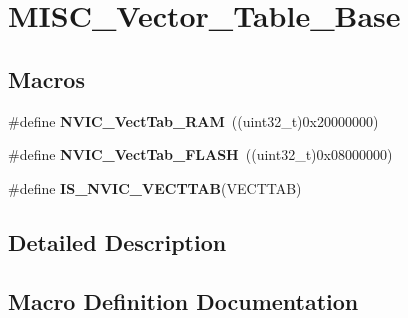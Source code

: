 \hypertarget{group___m_i_s_c___vector___table___base}{}\section{M\+I\+S\+C\+\_\+\+Vector\+\_\+\+Table\+\_\+\+Base}
\label{group___m_i_s_c___vector___table___base}
\subsection*{Macros}
\begin{DoxyCompactItemize}
\item 
\hypertarget{group___m_i_s_c___vector___table___base_ga8be8181cc3e5d42f6204af306ab50f80}{}\#define {\bfseries N\+V\+I\+C\+\_\+\+Vect\+Tab\+\_\+\+R\+A\+M}~((uint32\+\_\+t)0x20000000)\label{group___m_i_s_c___vector___table___base_ga8be8181cc3e5d42f6204af306ab50f80}

\item 
\hypertarget{group___m_i_s_c___vector___table___base_gafbf92fd28a1090b2aa49732ebd5704b5}{}\#define {\bfseries N\+V\+I\+C\+\_\+\+Vect\+Tab\+\_\+\+F\+L\+A\+S\+H}~((uint32\+\_\+t)0x08000000)\label{group___m_i_s_c___vector___table___base_gafbf92fd28a1090b2aa49732ebd5704b5}

\item 
\#define {\bfseries I\+S\+\_\+\+N\+V\+I\+C\+\_\+\+V\+E\+C\+T\+T\+A\+B}(V\+E\+C\+T\+T\+A\+B)
\end{DoxyCompactItemize}


\subsection{Detailed Description}


\subsection{Macro Definition Documentation}
\hypertarget{group___m_i_s_c___vector___table___base_ga26b9d493ccb98fcce9a27303078940c8}{}
